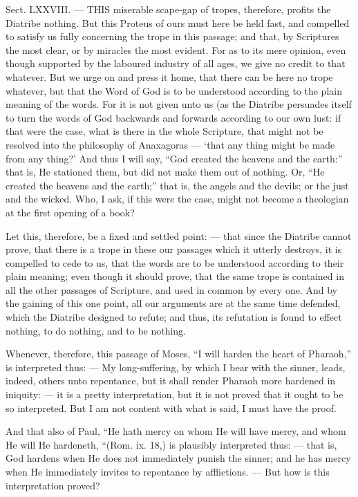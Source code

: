 Sect. LXXVIII. — THIS miserable scape-gap of tropes, therefore, profits the Diatribe nothing. But this Proteus of ours must here be held fast, and compelled to satisfy us fully concerning the trope in this passage; and that, by Scriptures the most clear, or by miracles the most evident. For as to its mere opinion, even though supported by the laboured industry of all ages, we give no credit to that whatever. But we urge on and press it home, that there can be here no trope whatever, but that the Word of God is to be understood according to the plain meaning of the words. For it is not given unto us (as the Diatribe persuades itself to turn the words of God backwards and forwards according to our own lust: if that were the case, what is there in the whole Scripture, that might not be resolved into the philosophy of Anaxagoras — ‘that any thing might be made from any thing?’ And thus I will say, “God created the heavens and the earth:” that is, He stationed them, but did not make them out of nothing. Or, “He created the heavens and the earth;” that is, the angels and the devils; or the just and the wicked. Who, I ask, if this were the case, might not become a theologian at the first opening of a book?

Let this, therefore, be a fixed and settled point: — that since the Diatribe cannot prove, that there is a trope in these our passages which it utterly destroys, it is compelled to cede to us, that the words are to be understood according to their plain meaning; even though it should prove, that the same trope is contained in all the other passages of Scripture, and used in common by every one. And by the gaining of this one point, all our arguments are at the same time defended, which the Diatribe designed to refute; and thus, its refutation is found to effect nothing, to do nothing, and to be nothing.

Whenever, therefore, this passage of Moses, “I will harden the heart of Pharaoh,” is interpreted thus: — My long-suffering, by which I bear with the sinner, leads, indeed, others unto repentance, but it shall render Pharaoh more hardened in iniquity: — it is a pretty interpretation, but it is not proved that it ought to be so interpreted. But I am not content with what is said, I must have the proof.

And that also of Paul, “He hath mercy on whom He will have mercy, and whom He will He hardeneth, “(Rom. ix. 18,) is plausibly interpreted thus: — that is, God hardens when He does not immediately punish the sinner; and he has mercy when He immediately invites to repentance by afflictions. — But how is this interpretation proved?

